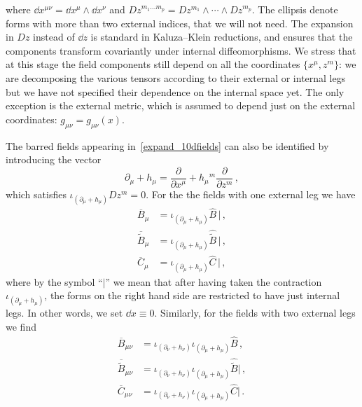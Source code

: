 \documentclass[debug]{phd}
\begin{document}
			where $\dd{x}^{\mu\nu} = \dd x^\mu\wedge \dd x^\nu$ and $Dz^{m_1\ldots m_p} = Dz^{m_1}\wedge \cdots \wedge Dz^{m_p}$.
			The ellipsis denote forms with more than two external indices, that we will not need. 
			The expansion in $Dz$ instead of $\dd z$ is standard in Kaluza--Klein reductions, and ensures that the components transform covariantly under internal diffeomorphisms. 
			We stress that at this stage the field components still depend on all the coordinates $\{x^\mu,z^m\}$: we are decomposing the various tensors according to their external or internal legs but we have not specified their dependence on the internal space yet. 
			The only exception is the external metric, which is assumed to depend just on the external coordinates: $g_{\mu\nu} = g_{\mu\nu}(x)$.
			
			The barred fields appearing in~\eqref{expand_10dfields} can also be identified by introducing the vector 
					\begin{equation}
						\partial_\mu + h_\mu = \frac{\partial}{\partial x^\mu} + h_\mu{}^m \frac{\partial}{\partial z^m}\,,
					\end{equation} 
			which satisfies $\iota_{(\partial_\mu + h_\mu)}Dz^m =0$. 
			For the the fields with one external leg we have 
					\begin{equation}
						\begin{split}
							\overline{B}_{\mu} &= \iota_{(\partial_\mu + h_\mu)} \hat B \, \big| \,, \\[1mm]
							\overline{\tilde B}_{\mu} &= \iota_{(\partial_\mu + h_\mu)} \hat{\tilde{B}} \, \big| \,, \\[1mm]
							\overline{C}_{\mu} &= \iota_{(\partial_\mu + h_\mu)} \hat C \, \big| \,,
						\end{split}
					\end{equation}
			where by the symbol ``$|$'' we mean that after having taken the contraction $\iota_{(\partial_\mu + h_\mu)}$, the forms on the right hand side are restricted to have just internal legs. 
			In other words, we set $\dd x \equiv 0$. 
			Similarly, for the fields with two external legs we find
					\begin{equation}\label{redef_one_forms_2}
						\begin{split}
							\overline{B}_{\mu\nu} &= \iota_{(\partial_\nu + h_\nu)} \iota_{(\partial_\mu + h_\mu)} \hat{B} \, , \\
							\overline{\tilde B}_{\mu\nu} &= \iota_{(\partial_\nu + h_\nu)} \iota_{(\partial_\mu + h_\mu)} \hat{\tilde B} \big|\, , \\
							\overline{C}_{\mu\nu} &= \iota_{(\partial_\nu + h_\nu)}\iota_{(\partial_\mu + h_\mu)} \hat{C} \big| \, .
						\end{split}
					\end{equation}
\end{document}
